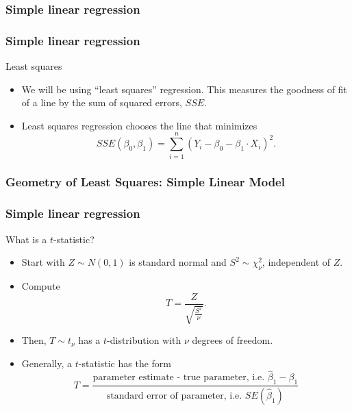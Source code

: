 \documentclass[handout]{beamer}
\begin{document}
   \begin{frame}
   \frametitle{Simple linear regression}
   \begin{center}
   \end{center}

   \end{frame}


   \begin{frame} \frametitle{Simple linear regression}

   \begin{block}
   {Least squares}
   \begin{itemize}
   \item We will be using ``least squares'' regression. This measures
   the goodness of fit of a line by the sum of squared errors, $SSE$.
   \item Least squares regression chooses the line that minimizes
   $$
   SSE(\beta_0, \beta_1) = \sum_{i=1}^n (Y_i - \beta_0 - \beta_1 \cdot X_i)^2.$$

   \end{itemize}
   \end{block}
   \end{frame}


   \begin{frame} \frametitle{Geometry of Least Squares: Simple Linear Model}

   \end{frame}


   \begin{frame} \frametitle{Simple linear regression}

   \begin{block}    {What is a $t$-statistic?}

   \begin{itemize}
   \item Start with $Z \sim N(0,1)$ is standard normal and $S^2 \sim \chi^2_{\nu}$, independent of $Z$.
   \item Compute
   $$
   T = \frac{Z}{\sqrt{\frac{S^2}{\nu}}}.$$

   \item Then,  $T \sim t_{\nu}$ has a $t$-distribution with $\nu$ degrees of freedom.


   \item Generally, a $t$-statistic has the form
   $$
   T = \frac{\text{parameter estimate - true parameter, i.e. $\widehat{\beta}_1-\beta_1$}}{\text{standard error of parameter, i.e. $SE(\widehat{\beta}_1)$}}$$
   \end{itemize}
   \end{block}
   \end{frame}
\end{document}
